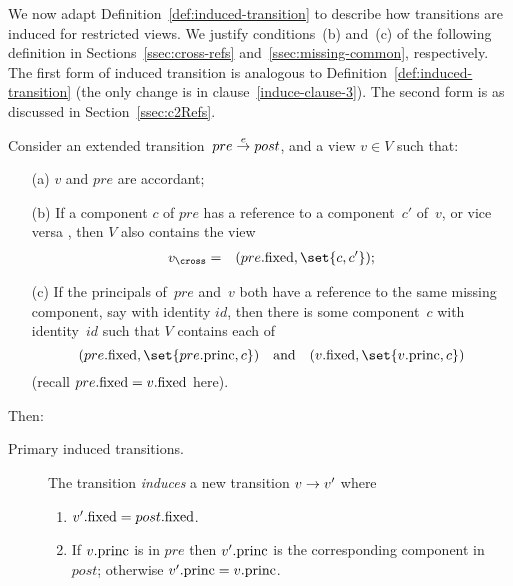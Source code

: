 We now adapt Definition~\ref{def:induced-transition} to describe how
transitions are induced for restricted views.  We justify conditions~(b)
and~(c) of the following definition in Sections~\ref{ssec:cross-refs}
and~\ref{ssec:missing-common}, respectively.  The first form of induced
transition is analogous to Definition~\ref{def:induced-transition} (the only
change is in clause~\ref{induce-clause-3}).  The second form is as discussed
in Section~\ref{ssec:c2Refs}.
%
\begin{definition}
\label{def:induced-transition-singleRef}
Consider an extended transition~$pre \stackrel{e}\rightarrow post$, and a view $v \in V$
such that:
%
\begin{enumerate}
\item[(a)] $v$ and $pre$ are accordant;

\item[(b)] If a component $c$ of $pre$ has a reference to a component~$c'$
  of~$v$, or vice versa , then $V$ also contains the view
\begin{eqnarray*}
v_\cross & = & (pre.\fixed, \set{c, c'});
\end{eqnarray*}

\item[(c)] If the principals of~$pre$ and~$v$ both have a reference to the
  same missing component, say with identity $id$, then there is some
  component~$c$ with identity~$id$ such that $V$ contains each of
\[
(pre.\fixed, \set{pre.\princ, c}) \quad\mbox{and}\quad 
(v.\fixed, \set{v.\princ, c})
\]
(recall $pre.\mathrm{fixed} = v.\mathrm{fixed}$ here).
\end{enumerate}
%
Then:
\begin{description}
\item[Primary induced transitions.]
The transition \emph{induces} a new
transition $v \stackrel{}\rightarrow v'$ where
\begin{enumerate}
\item $v'.\mathrm{fixed} = post.\mathrm{fixed}$.

\item If $v.\mathrm{princ}$ is in $pre$ then $v'.\mathrm{princ}$ is the corresponding
  component in~$post$; otherwise $v'.\mathrm{princ} = v.\mathrm{princ}$.



\end{enumerate}
\end{description}
\end{definition}
